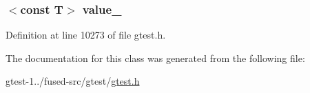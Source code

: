 \hypertarget{classtesting_1_1internal_1_1ValuesInIteratorRangeGenerator_1_1Iterator_a40940c6bbac9357990c7a71bbeae1568}{
\subsubsection[{value\-\_\-}]{$<$const \-T$>$ {\bf value\-\_\-}}}\label{da/d4b/classtesting_1_1internal_1_1ValuesInIteratorRangeGenerator_1_1Iterator_a40940c6bbac9357990c7a71bbeae1568}


\-Definition at line 10273 of file gtest.\-h.



\-The documentation for this class was generated from the following file\-:\begin{DoxyCompactItemize}
\item 
gtest-\/1../fused-\/src/gtest/\hyperlink{fused-src_2gtest_2gtest_8h}{gtest.\-h}\end{DoxyCompactItemize}
